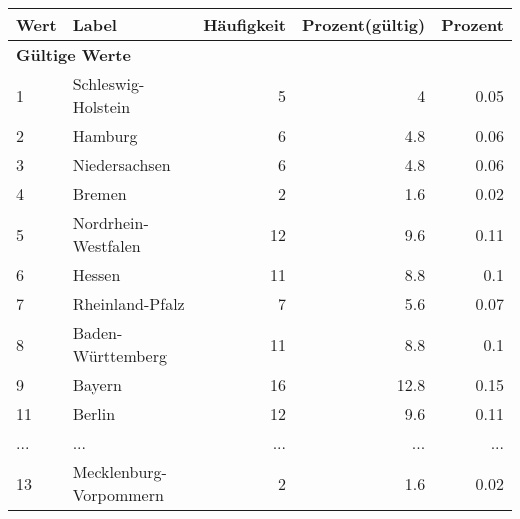      \begin{longtable}{lXrrr}
     \toprule
     \textbf{Wert} & \textbf{Label} & \textbf{Häufigkeit} & \textbf{Prozent(gültig)} & \textbf{Prozent} \\
     \endhead
     \midrule
     \multicolumn{5}{l}{\textbf{Gültige Werte}}\\
        1 & \multicolumn{1}{X}{Schleswig-Holstein} & %
          \num{5} &
          \num[round-mode=places,round-precision=2]{4} &
          \num[round-mode=places,round-precision=2]{0,05} \\
        2 & \multicolumn{1}{X}{Hamburg} & %
          \num{6} &
          \num[round-mode=places,round-precision=2]{4,8} &
          \num[round-mode=places,round-precision=2]{0,06} \\
        3 & \multicolumn{1}{X}{Niedersachsen} & %
          \num{6} &
          \num[round-mode=places,round-precision=2]{4,8} &
          \num[round-mode=places,round-precision=2]{0,06} \\
        4 & \multicolumn{1}{X}{Bremen} & %
          \num{2} &
          \num[round-mode=places,round-precision=2]{1,6} &
          \num[round-mode=places,round-precision=2]{0,02} \\
        5 & \multicolumn{1}{X}{Nordrhein-Westfalen} & %
          \num{12} &
          \num[round-mode=places,round-precision=2]{9,6} &
          \num[round-mode=places,round-precision=2]{0,11} \\
        6 & \multicolumn{1}{X}{Hessen} & %
          \num{11} &
          \num[round-mode=places,round-precision=2]{8,8} &
          \num[round-mode=places,round-precision=2]{0,1} \\
        7 & \multicolumn{1}{X}{Rheinland-Pfalz} & %
          \num{7} &
          \num[round-mode=places,round-precision=2]{5,6} &
          \num[round-mode=places,round-precision=2]{0,07} \\
        8 & \multicolumn{1}{X}{Baden-Württemberg} & %
          \num{11} &
          \num[round-mode=places,round-precision=2]{8,8} &
          \num[round-mode=places,round-precision=2]{0,1} \\
        9 & \multicolumn{1}{X}{Bayern} & %
          \num{16} &
          \num[round-mode=places,round-precision=2]{12,8} &
          \num[round-mode=places,round-precision=2]{0,15} \\
        11 & \multicolumn{1}{X}{Berlin} & %
          \num{12} &
          \num[round-mode=places,round-precision=2]{9,6} &
          \num[round-mode=places,round-precision=2]{0,11} \\
       ... & ... & ... & ... & ... \\
        13 & \multicolumn{1}{X}{Mecklenburg-Vorpommern} & %
          \num{2} &
          \num[round-mode=places,round-precision=2]{1,6} &
          \num[round-mode=places,round-precision=2]{0,02} \\


\end{longtable}
